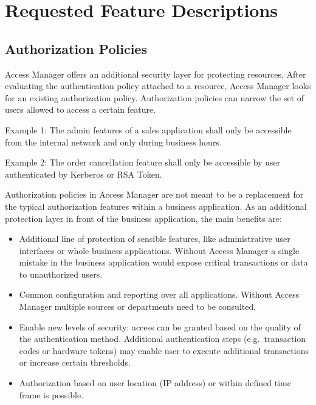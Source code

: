 \documentclass[11pt]{report}
\begin{document}
\chapter{Requested Feature Descriptions}


\section{Authorization Policies}


Access Manager offers an additional security layer for protecting resources,
After evaluating the authentication policy attached to a resource, Access
Manager looks for an existing authorization policy.  Authorization policies can
narrow the set of users allowed to access a certain feature.  

\begin{description}

    \item{Example 1}: The admin features of a sales application shall only be
        accessible from the internal network and only during business hours.

    \item{Example 2}: The order cancellation feature shall only be accessible by
        user authenticated by Kerberos or RSA Token.

\end{description}

Authorization policies in Access Manager are not meant to be a replacement for
the typical authorization features within a business application. As an
additional protection layer in front of the business application, the main
benefits are:

\begin{itemize}

    \item Additional line of protection of sensible features, like
        administrative user interfaces or whole business applications. Without
        Access Manager a single mistake in the business application would
        expose critical transactions or data to unauthorized users.

    \item Common configuration and reporting over all applications. Without
        Access Manager multiple sources or departments need to be consulted.

    \item Enable new levels of security: access can be granted based on the
        quality of the authentication method. Additional authentication steps
        (e.g.\ transaction codes or hardware tokens) may enable user to execute
        additional transactions or increase certain thresholds.

    \item Authorization based on user location (IP address) or within defined
        time frame is possible.

\end{itemize}
\end{document}
